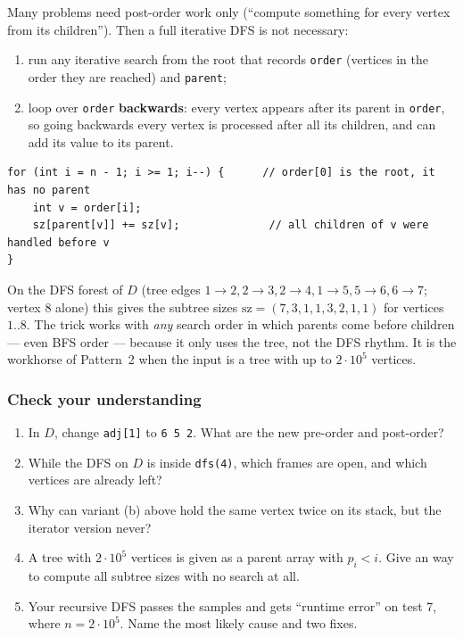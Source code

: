 Many problems need post-order work only (``compute something for every vertex from its children''). Then a full iterative DFS is not necessary:
\begin{enumerate}[leftmargin=*]
    \item run any iterative search from the root that records \texttt{order} (vertices in the order they are reached) and \texttt{parent};
    \item loop over \texttt{order} \textbf{backwards}: every vertex appears after its parent in \texttt{order}, so going backwards every vertex is processed after all its children, and can add its value to its parent.
\end{enumerate}
\begin{lstlisting}[style=snippet]
for (int i = n - 1; i >= 1; i--) {      // order[0] is the root, it has no parent
    int v = order[i];
    sz[parent[v]] += sz[v];              // all children of v were handled before v
}
\end{lstlisting}
On the DFS forest of $D$ (tree edges $1{\to}2, 2{\to}3, 2{\to}4, 1{\to}5, 5{\to}6, 6{\to}7$; vertex 8 alone) this gives the subtree sizes $\mathrm{sz} = (7,3,1,1,3,2,1,1)$ for vertices $1..8$. The trick works with \emph{any} search order in which parents come before children --- even BFS order --- because it only uses the tree, not the DFS rhythm. It is the workhorse of Pattern~2 when the input is a tree with up to $2\cdot10^5$ vertices.

\subsubsection*{Check your understanding}

\begin{enumerate}[leftmargin=*]
    \item In $D$, change \texttt{adj[1]} to \texttt{6 5 2}. What are the new pre-order and post-order?
    \item While the DFS on $D$ is inside \texttt{dfs(4)}, which frames are open, and which vertices are already left?
    \item Why can variant (b) above hold the same vertex twice on its stack, but the iterator version never?
    \item A tree with $2\cdot 10^5$ vertices is given as a parent array with $p_i < i$. Give an  way to compute all subtree sizes with no search at all.
    \item Your recursive DFS passes the samples and gets ``runtime error'' on test 7, where $n = 2\cdot10^5$. Name the most likely cause and two fixes.
\end{enumerate}

